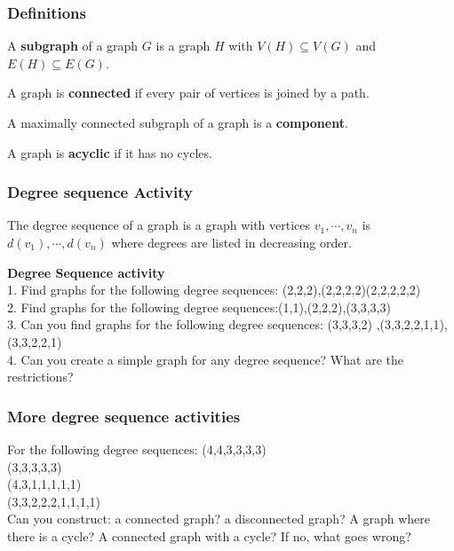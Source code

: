 \documentclass{beamer}
\begin{document}
\frame
{
\frametitle{Definitions}

\begin{definition}[Subgraph]
A { \bf subgraph} of a graph $G$ is a graph $H$ with $V(H) \subseteq V(G)$
and $E(H) \subseteq E(G)$.
\end{definition}


\begin{definition}[Connected]
A graph is {\bf connected} if every pair of vertices is joined by a path.
\end{definition}

\begin{definition}[Component]
A maximally connected subgraph of a graph is a {\bf component}.
\end{definition}

\begin{definition}[Acyclic]
A graph is {\bf acyclic} if it has no cycles.
\end{definition}

}



\frame
{
  \frametitle{Degree sequence Activity}
  
\begin{definition}
The degree sequence of a graph is a graph with vertices
$v_1,\cdots,v_n$ is $d(v_1),\cdots,d(v_n)$ where degrees are listed in decreasing order.
\end{definition}
  

{\bf Degree Sequence activity}\\
1. Find graphs for the following degree sequences: (2,2,2),(2,2,2,2)(2,2,2,2,2)\\
2. Find graphs for the following degree sequences:(1,1),(2,2,2),(3,3,3,3)\\
3. Can you find graphs for the following degree sequences: (3,3,3,2) ,(3,3,2,2,1,1), (3,3,2,2,1)\\
4. Can you create a simple graph for any degree sequence?  What are the restrictions?


}


\frame
{
  \frametitle{More degree sequence activities}
For the following degree sequences: 
\vfill
(4,4,3,3,3,3)\\
(3,3,3,3,3)\\
(4,3,1,1,1,1,1)\\
(3,3,2,2,2,1,1,1,1) \\
\vfill
Can you construct: a connected graph? a disconnected graph? A graph where there is a cycle? A connected graph with a cycle?
If no, what goes wrong?


}
\end{document}
